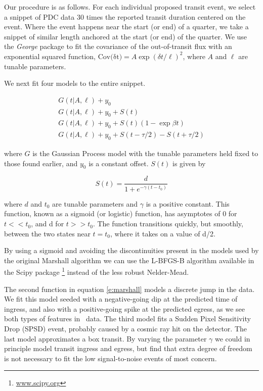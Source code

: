 Our procedure is as follows. For each individual proposed transit event, we select a snippet of PDC data 30 times the reported transit duration centered on the event. Where the event happens near the start (or end) of a quarter, we take a snippet of similar length anchored at the start (or end) of the quarter. We use the \emph{George} package \citep{Ambikasaran14} to fit the covariance of the out-of-transit flux with an exponential squared function, $ {\mathrm{Cov(\delta t})} = A \exp{ (\delta t/\ell)^2}$, where $A$ and $\ell$ are tunable parameters. 

We next fit four models to the entire snippet.

\begin{equation}
\left.\begin{aligned}
G(t | A, \ell) + y_0 \\
G(t | A, \ell) + y_0 + S(t)\\
G(t | A, \ell) + y_0 + S(t)(1 - \exp{\beta t})\\
G(t | A, \ell) + y_0 + S(t - \tau/2) - S(t + \tau/2) 
\end{aligned}\right.
\label{e:marshall}
\end{equation}

\noindent
where $G$ is the Gaussian Process model with the tunable parameters held fixed to those found earlier, and $y_0$ is a constant offset. $S(t)$ is given by

\begin{equation}
S(t) = \frac{d}{1 + e^{-\gamma (t-t_0)} }
\end{equation}

\noindent
where $d$ and $t_0$ are tunable parameters and $\gamma$ is a positive constant. This function, known as a sigmoid (or logistic) function, has asymptotes of 0 for $t<<t_0$, and d for $t>>t_0$. The function transitions quickly, but smoothly, between the two states near $t=t_0$, where it takes on a value of d/2. 

By using a sigmoid and avoiding the discontinuities present in the models used by the original Marshall algorithm \citep{Mullally2016} we can use the L-BFGS-B algorithm \citep{Byrd95} available in the Scipy package \footnote{\url{www.scipy.org}} instead of the less robust Nelder-Mead.

The second function in equation \ref{e:marshall} models a discrete jump in the data. We fit this model seeded with a negative-going dip at the predicted time of ingress, and also with a positive-going spike at the predicted egress, as we see both types of features in \Kepler\ data. The third model fits a Sudden Pixel Sensitivity Drop (SPSD) event, probably caused by a cosmic ray hit on the detector. The last model approximates a box transit. By varying the parameter $\gamma$ we could in principle model transit ingress and egress, but find that extra degree of freedom is not necessary to fit the low signal-to-noise events of most concern.

